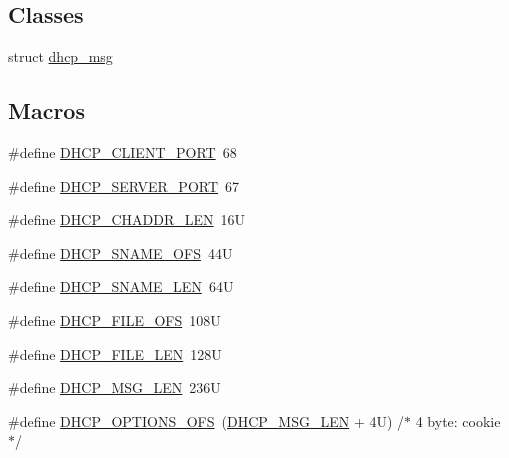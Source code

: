 \subsection*{Classes}
\begin{DoxyCompactItemize}
\item 
struct \hyperlink{structdhcp__msg}{dhcp\+\_\+msg}
\end{DoxyCompactItemize}
\subsection*{Macros}
\begin{DoxyCompactItemize}
\item 
\#define \hyperlink{openmote-cc2538_2lwip_2src_2include_2lwip_2prot_2dhcp_8h_a23dd788b1cd28a0d834c3afefceaa1c1}{D\+H\+C\+P\+\_\+\+C\+L\+I\+E\+N\+T\+\_\+\+P\+O\+RT}~68
\item 
\#define \hyperlink{openmote-cc2538_2lwip_2src_2include_2lwip_2prot_2dhcp_8h_a478f5be6fb4bfb09b235bb50cf806cc9}{D\+H\+C\+P\+\_\+\+S\+E\+R\+V\+E\+R\+\_\+\+P\+O\+RT}~67
\item 
\#define \hyperlink{openmote-cc2538_2lwip_2src_2include_2lwip_2prot_2dhcp_8h_a15b8e74ffbf5eb908da440c307401c04}{D\+H\+C\+P\+\_\+\+C\+H\+A\+D\+D\+R\+\_\+\+L\+EN}~16U
\item 
\#define \hyperlink{openmote-cc2538_2lwip_2src_2include_2lwip_2prot_2dhcp_8h_a370421b9ce80052774e0dd8a6437a025}{D\+H\+C\+P\+\_\+\+S\+N\+A\+M\+E\+\_\+\+O\+FS}~44U
\item 
\#define \hyperlink{openmote-cc2538_2lwip_2src_2include_2lwip_2prot_2dhcp_8h_a4227e9baee8b09567d1d9dda9d8a8cf3}{D\+H\+C\+P\+\_\+\+S\+N\+A\+M\+E\+\_\+\+L\+EN}~64U
\item 
\#define \hyperlink{openmote-cc2538_2lwip_2src_2include_2lwip_2prot_2dhcp_8h_a87e51df90840a08fe0a3602d126ebfe3}{D\+H\+C\+P\+\_\+\+F\+I\+L\+E\+\_\+\+O\+FS}~108U
\item 
\#define \hyperlink{openmote-cc2538_2lwip_2src_2include_2lwip_2prot_2dhcp_8h_a4ffd004c5d53666e9315d9571af6d41b}{D\+H\+C\+P\+\_\+\+F\+I\+L\+E\+\_\+\+L\+EN}~128U
\item 
\#define \hyperlink{openmote-cc2538_2lwip_2src_2include_2lwip_2prot_2dhcp_8h_a418d69a76814cebcbe22d0211c686a53}{D\+H\+C\+P\+\_\+\+M\+S\+G\+\_\+\+L\+EN}~236U
\item 
\#define \hyperlink{openmote-cc2538_2lwip_2src_2include_2lwip_2prot_2dhcp_8h_af5e2f617c0b6005fb50db9851797be1b}{D\+H\+C\+P\+\_\+\+O\+P\+T\+I\+O\+N\+S\+\_\+\+O\+FS}~(\hyperlink{openmote-cc2538_2lwip_2src_2include_2lwip_2prot_2dhcp_8h_a418d69a76814cebcbe22d0211c686a53}{D\+H\+C\+P\+\_\+\+M\+S\+G\+\_\+\+L\+EN} + 4\+U) /$\ast$ 4 byte\+: cookie $\ast$/

\end{DoxyCompactItemize}
